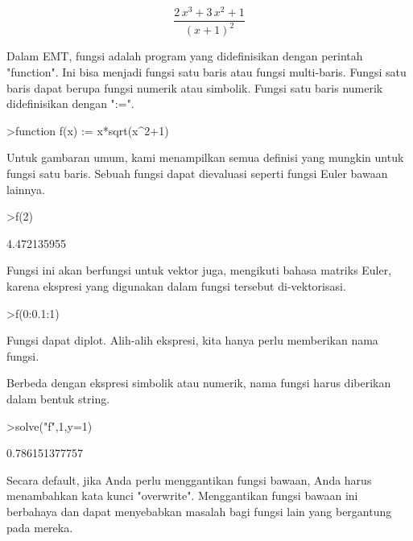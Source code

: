 \documentclass[a4paper,10pt]{article}
\begin{document}
\begin{eulernotebook}
\begin{eulercomment}
\begin{eulercomment}
\begin{eulerformula}
\[
\frac{2\,x^3+3\,x^2+1}{\left(x+1\right)^2}
\]
\end{eulerformula}
\begin{eulercomment}
Dalam EMT, fungsi adalah program yang didefinisikan dengan perintah
"function". Ini bisa menjadi fungsi satu baris atau fungsi
multi-baris. Fungsi satu baris dapat berupa fungsi numerik atau
simbolik. Fungsi satu baris numerik didefinisikan dengan ":=".
\end{eulercomment}
\begin{eulerprompt}
>function f(x) := x*sqrt(x^2+1)
\end{eulerprompt}
\begin{eulercomment}
Untuk gambaran umum, kami menampilkan semua definisi yang mungkin
untuk fungsi satu baris. Sebuah fungsi dapat dievaluasi seperti fungsi
Euler bawaan lainnya.
\end{eulercomment}
\begin{eulerprompt}
>f(2)
\end{eulerprompt}
\begin{euleroutput}
  4.472135955
\end{euleroutput}
\begin{eulercomment}
Fungsi ini akan berfungsi untuk vektor juga, mengikuti bahasa matriks
Euler, karena ekspresi yang digunakan dalam fungsi tersebut
di-vektorisasi.
\end{eulercomment}
\begin{eulerprompt}
>f(0:0.1:1)
\end{eulerprompt}
\begin{euleroutput}
  [0,  0.100499,  0.203961,  0.313209,  0.430813,  0.559017,  0.699714,
  0.854459,  1.0245,  1.21083,  1.41421]
\end{euleroutput}
\begin{eulercomment}
Fungsi dapat diplot. Alih-alih ekspresi, kita hanya perlu memberikan
nama fungsi.

Berbeda dengan ekspresi simbolik atau numerik, nama fungsi harus
diberikan dalam bentuk string.
\end{eulercomment}
\begin{eulerprompt}
>solve("f",1,y=1)
\end{eulerprompt}
\begin{euleroutput}
  0.786151377757
\end{euleroutput}
\begin{eulercomment}
Secara default, jika Anda perlu menggantikan fungsi bawaan, Anda harus
menambahkan kata kunci "overwrite". Menggantikan fungsi bawaan ini
berbahaya dan dapat menyebabkan masalah bagi fungsi lain yang
bergantung pada mereka.


\end{eulercomment}
\end{eulercomment}
\end{eulercomment}
\end{eulernotebook}
\end{document}
